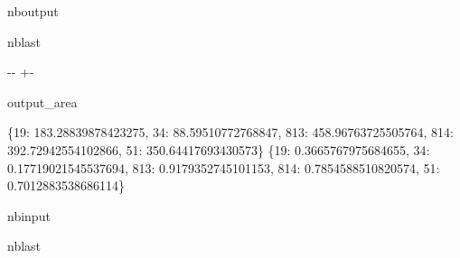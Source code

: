 \documentclass[letterpaper,10pt,english]{sphinxmanual}
\begin{document}
\begin{sphinxuseclass}{nboutput}
\begin{sphinxuseclass}{nblast}
{

\kern-\sphinxverbatimsmallskipamount\kern-\baselineskip
\kern+\FrameHeightAdjust\kern-\fboxrule
\vspace{\nbsphinxcodecellspacing}

\begin{sphinxuseclass}{output_area}
\begin{sphinxuseclass}{}


\begin{sphinxVerbatim}[commandchars=\\\{\}]
\{19: 183.28839878423275, 34: 88.59510772768847, 813: 458.96763725505764, 814: 392.72942554102866, 51: 350.64417693430573\}
\{19: 0.3665767975684655, 34: 0.17719021545537694, 813: 0.9179352745101153, 814: 0.7854588510820574, 51: 0.7012883538686114\}
\end{sphinxVerbatim}



\end{sphinxuseclass}
\end{sphinxuseclass}
}

\end{sphinxuseclass}
\end{sphinxuseclass}
\begin{sphinxuseclass}{nbinput}
\begin{sphinxuseclass}{nblast}
{
\begin{sphinxVerbatim}[commandchars=\\\{\}]
\llap{\color{nbsphinxin}[26]:\,\hspace{\fboxrule}\hspace{\fboxsep}}  
  \PYG{p}{[}\PYG{p}{]} 

  
  
  
  
\end{sphinxVerbatim}
}

\end{sphinxuseclass}
\end{sphinxuseclass}
\end{document}
